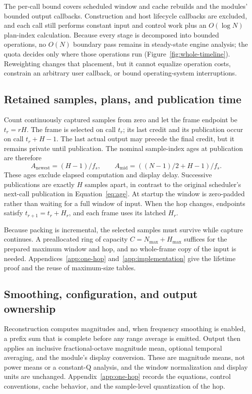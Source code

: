 The per-call bound covers scheduled window and cache rebuilds and the modules'
bounded output callbacks. Construction and host lifecycle callbacks are
excluded, and each call still performs constant input and control work plus an
$O(\log N)$ plan-index calculation. Because every stage is decomposed into
bounded operations, no $O(N)$ boundary pass remains in steady-state engine
analysis; the quota decides only where those operations run
(Figure~\ref{fig:whole-timeline}). Reweighting changes that placement, but it
cannot equalize operation costs, constrain an arbitrary user callback, or
bound operating-system interruptions.

\subsection{Retained samples, plans, and publication time}
Count continuously captured samples from zero and let the frame endpoint be
$t_r=rH$. The frame is selected on call $t_r$; its last credit and its
publication occur on call $t_r+H-1$. The last actual output may precede the
final credit, but it remains private until publication. The nominal
sample-index ages at publication are therefore
\begin{equation}
 A_{\mathrm{newest}}=(H-1)/f_s,\qquad
 A_{\mathrm{mid}}=((N-1)/2+H-1)/f_s.
 \label{eq:wholeage}
\end{equation}
These ages exclude elapsed computation and display delay. Successive
publications are exactly $H$ samples apart, in contrast to the original
scheduler's next-call publication in Equation~\eqref{eq:age}. At startup the
window is zero-padded rather than waiting for a full window of input. When the
hop changes, endpoints satisfy $t_{r+1}=t_r+H_r$, and each frame uses its
latched $H_r$.

Because packing is incremental, the selected samples must survive while
capture continues. A preallocated ring of capacity $C=N_{\max}+H_{\max}$
suffices for the prepared maximum window and hop, and no whole-frame copy of
the input is needed. Appendices~\ref{app:one-hop} and~\ref{app:implementation}
give the lifetime proof and the reuse of maximum-size tables.

\subsection{Smoothing, configuration, and output ownership}
Reconstruction computes magnitudes and, when frequency smoothing is enabled,
a prefix sum that is complete before any range average is emitted. Output then
applies an inclusive fractional-octave magnitude mean, optional temporal
averaging, and the module's display conversion. These are magnitude means, not
power means or a constant-Q analysis, and the window normalization and display
units are unchanged. Appendix~\ref{app:one-hop} records the equations, control
conventions, cache behavior, and the sample-level quantization of the hop.

